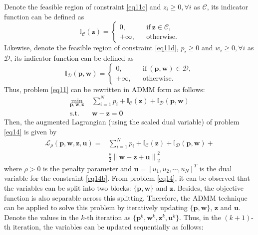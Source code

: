 \documentclass[journal]{IEEEtran}
\begin{document}
Denote the feasible region of constraint \eqref{eq11c} and $z_i \geq 0, \forall i$ as $\mathcal{C}$, its indicator function can be defined as
\begin{equation}
\mathbb{I}_\mathcal{C}\left(\mathbf{z}\right) = \left\{ \begin{array}{lcl}
0, & &\mbox{if} \ \mathbf{z} \in \mathcal{C}, \\
+\infty, & &\mbox{otherwise}.
\end{array}
\right.
\end{equation}
Likewise, denote the feasible region of constraint \eqref{eq11d}, $p_i\geq 0$ and $w_i \geq 0, \forall i$ as $\mathcal{D}$, its indicator function can be defined as
\begin{equation}
\mathbb{I}_\mathcal{D}\left(\mathbf{p},\mathbf{w}\right) = \left\{ \begin{array}{lcl}
0, & &\mbox{if} \ \left(\mathbf{p}, \mathbf{w}\right) \in \mathcal{D}, \\
+\infty, & &\mbox{otherwise}.
\end{array}
\right.
\end{equation}
Thus, problem \eqref{eq11} can be rewritten in ADMM form as follows:
\begin{subequations}\label{eq14}
	\begin{align}
	\min_{\mathbf{p}, \mathbf{w}, \mathbf{z}}\ & \sum\limits_{i = 1}^{N} p_i + \mathbb{I}_\mathcal{C}\left(\mathbf{z}\right) + \mathbb{I}_\mathcal{D}\left(\mathbf{p},\mathbf{w}\right)  \label{eq14a} \\ \mbox{s.t.} \quad &  \mathbf{w} - \mathbf{z} = \mathbf{0} \label{eq14b}
	\end{align}
\end{subequations}
Then, the augmented Lagrangian (using the scaled dual variable) of problem \eqref{eq14} is given by
\begin{align}
\mathcal{L}_\rho\left(\mathbf{p},\mathbf{w}, \mathbf{z},\mathbf{u}\right) = & \sum\limits_{i = 1}^{N} p_i + \mathbb{I}_\mathcal{C}\left(\mathbf{z}\right) + \mathbb{I}_\mathcal{D}\left(\mathbf{p},\mathbf{w}\right) + \\ & \frac{\rho}{2}\left\|\mathbf{w} - \mathbf{z} + \mathbf{u}\right\|_2^2
\end{align}
where $\rho > 0$ is the penalty parameter and $\mathbf{u} = [u_1, u_2, \cdots, u_N]^T$ is the dual variable for the  constraint \eqref{eq14b}. From problem \eqref{eq14}, it can be observed that the variables can be split into two blocks: $\{\mathbf{p}, \mathbf{w}\}$ and $\mathbf{z}$. Besides, the objective function is also separable across this splitting. Therefore, the ADMM technique can be applied to solve this problem by iteratively updating $\{\mathbf{p}, \mathbf{w}\}$, $\mathbf{z}$ and $\mathbf{u}$. Denote the values in the $k$-th iteration as $\{\mathbf{p}^k, \mathbf{w}^k, \mathbf{z}^k, \mathbf{u}^k\}$. Thus, in the $(k+1)$-th iteration, the variables can be updated sequentially as follows:
 
\end{document}
